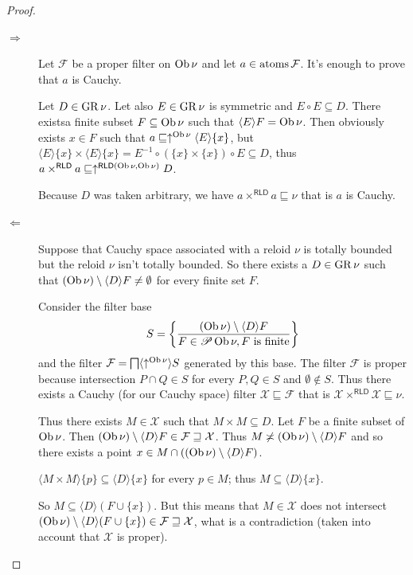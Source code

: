 \begin{proof}~
  
  \begin{description}
    \item[$\Rightarrow$] Let $\mathcal{F}$ be a proper filter on $\operatorname{Ob}
    \nu$ and let $a \in \operatorname{atoms} \mathcal{F}$. It's enough to prove that
    $a$ is Cauchy.
    
    Let $D \in \operatorname{GR} \nu$. Let also $E \in \operatorname{GR} \nu$ is symmetric
    and $E \circ E \subseteq D$. There existsa finite subset $F \subseteq
    \operatorname{Ob} \nu$ such that $\langle E \rangle F = \operatorname{Ob} \nu$. Then
    obviously exists $x \in F$ such that $a \sqsubseteq \uparrow^{\operatorname{Ob}
    \nu} \langle E \rangle \{ x \}$, but $\langle E \rangle \{ x \} \times
    \langle E \rangle \{ x \} = E^{- 1} \circ (\{ x \} \times \{ x \}) \circ E
    \subseteq D$, thus $a \times^{\mathsf{RLD}} a \sqsubseteq
    \uparrow^{\mathsf{RLD} (\operatorname{Ob} \nu , \operatorname{Ob} \nu)} D$.
    
    Because $D$ was taken arbitrary, we have $a \times^{\mathsf{RLD}} a
    \sqsubseteq \nu$ that is $a$ is Cauchy.
    
    \item[$\Leftarrow$] Suppose that Cauchy space associated with a reloid
    $\nu$ is totally bounded but the reloid $\nu$ isn't totally bounded. So
    there exists a $D \in \operatorname{GR} \nu$ such that $(\operatorname{Ob} \nu) \setminus
    \langle D \rangle F \neq \emptyset$ for every finite set $F$.
    
    Consider the filter base
    \[ S = \left\{ \frac{ (\operatorname{Ob} \nu) \setminus \langle D \rangle F}{F \in \mathscr{P} \operatorname{Ob} \nu, F \text{ is finite}
       }\right\} \]
    and the filter $\mathcal{F} = \bigsqcap \langle \uparrow^{\operatorname{Ob} \nu}
    \rangle S$ generated by this base. The filter $\mathcal{F}$ is proper
    because intersection $P \cap Q \in S$ for every $P, Q \in S$ and
    $\emptyset \notin S$. Thus there exists a Cauchy (for our Cauchy space)
    filter $\mathcal{X} \sqsubseteq \mathcal{F}$ that is $\mathcal{X}
    \times^{\mathsf{RLD}} \mathcal{X} \sqsubseteq \nu$.
    
    Thus there exists $M \in \mathcal{X}$ such that $M \times M \subseteq D$.
    Let $F$ be a finite subset of $\operatorname{Ob} \nu$. Then $(\operatorname{Ob} \nu)
    \setminus \langle D \rangle F \in \mathcal{F} \sqsupseteq \mathcal{X}$.
    Thus $M \not\asymp (\operatorname{Ob} \nu) \setminus \langle D \rangle F$ and so
    there exists a point $x \in M \cap ((\operatorname{Ob} \nu) \setminus \langle D
    \rangle F)$.
    
    $\langle M \times M \rangle \{ p \} \subseteq \langle D \rangle \{ x \}$
    for every $p \in M$; thus $M \subseteq \langle D \rangle \{ x \}$.
    
    So $M \subseteq \langle D \rangle (F \cup \{ x \})$. But this means that
    $M \in \mathcal{X}$ does not intersect $(\operatorname{Ob} \nu) \setminus \langle
    D \rangle (F \cup \{ x \}) \in \mathcal{F} \sqsupseteq \mathcal{X}$, what
    is a contradiction (taken into account that $\mathcal{X}$ is proper).
  \end{description}
\end{proof}


